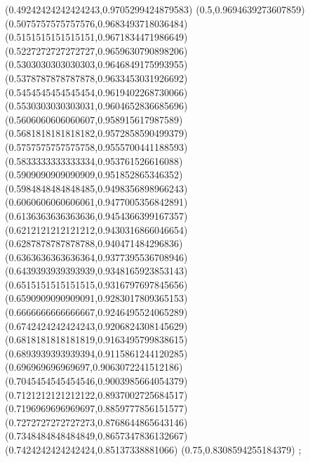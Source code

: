 {(0.49242424242424243,0.9705299424879583)
(0.5,0.9694639273607859)
(0.5075757575757576,0.9683493718036484)
(0.5151515151515151,0.9671834471986649)
(0.5227272727272727,0.9659630790898206)
(0.5303030303030303,0.9646849175993955)
(0.5378787878787878,0.9633453031926692)
(0.5454545454545454,0.9619402268730066)
(0.5530303030303031,0.9604652836685696)
(0.5606060606060607,0.958915617987589)
(0.5681818181818182,0.9572858590499379)
(0.5757575757575758,0.9555700441188593)
(0.5833333333333334,0.953761526616088)
(0.5909090909090909,0.951852865346352)
(0.5984848484848485,0.9498356898966243)
(0.6060606060606061,0.9477005356842891)
(0.6136363636363636,0.9454366399167357)
(0.6212121212121212,0.9430316866046654)
(0.6287878787878788,0.940471484296836)
(0.6363636363636364,0.9377395536708946)
(0.6439393939393939,0.9348165923853143)
(0.6515151515151515,0.9316797697845656)
(0.6590909090909091,0.9283017809365153)
(0.6666666666666667,0.9246495524065289)
(0.6742424242424243,0.9206824308145629)
(0.6818181818181819,0.9163495799838615)
(0.6893939393939394,0.9115861244120285)
(0.696969696969697,0.9063072241512186)
(0.7045454545454546,0.9003985664054379)
(0.7121212121212122,0.8937002725684517)
(0.7196969696969697,0.8859777856151577)
(0.7272727272727273,0.8768644865643146)
(0.7348484848484849,0.8657347836132667)
(0.7424242424242424,0.85137338881066)
(0.75,0.8308594255184379)
};
